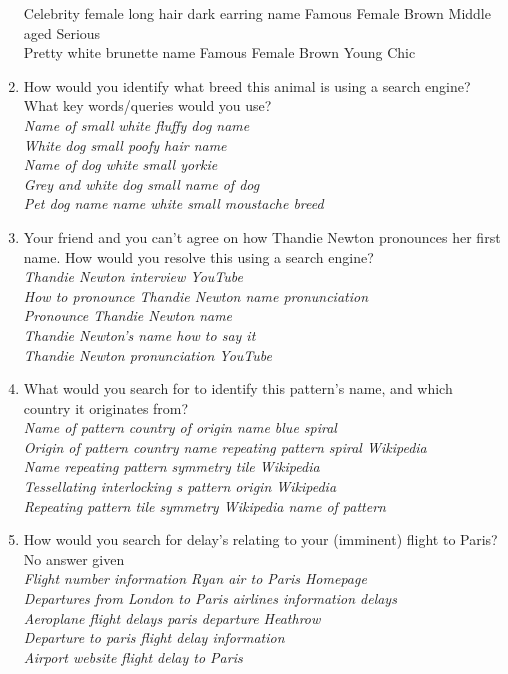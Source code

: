 \documentclass[a4paper, 11pt]{article}
\begin{document}
\begin{enumerate}
{{Celebrity female long hair dark earring name Famous Female Brown Middle aged Serious \\
Pretty white brunette name Famous Female Brown Young Chic
}}
\item{How would you identify what breed this animal is using a search engine? What key words/queries would you use?\\\textit{
Name of small white fluffy dog name \\       
White dog small poofy hair name \\      
Name of dog white small  yorkie  \\
Grey and white dog small  name of dog \\
Pet dog name name white small moustache breed      
}}
\item{Your friend and you can't agree on how Thandie Newton pronounces her first name. How would you resolve this using a search engine?\\\textit{
Thandie Newton interview YouTube \\    
How to pronounce Thandie Newton name pronunciation \\
Pronounce Thandie Newton name \\
Thandie Newton's name how to say it\\
Thandie Newton pronunciation YouTube   
}}
\item{What would you search for to identify this pattern's name, and which country it originates from?\\\textit{
Name of pattern country of origin name blue spiral \\     
Origin of pattern country name repeating pattern  spiral Wikipedia \\     
Name repeating pattern  symmetry tile   Wikipedia \\
Tessellating interlocking s pattern origin Wikipedia \\ 
Repeating pattern tile symmetry Wikipedia name of pattern   
}}
\item{How would you search for delay's relating to your (imminent) flight to Paris?\\No answer given\\\textit{
Flight number information Ryan air to Paris  Homepage \\
Departures from London to Paris airlines information delays \\
Aeroplane flight delays paris departure Heathrow \\     
Departure to paris flight delay  information \\
Airport website flight delay to Paris  
}}
\end{enumerate}
\end{document}
